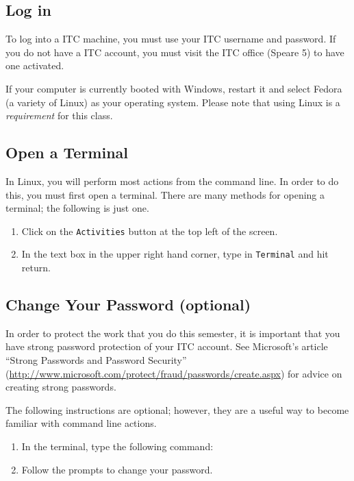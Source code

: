 \documentclass[11pt]{cselabheader}
\begin{document}
\subsection{Log in}
To log into a ITC machine, you must use your ITC username and password. If you
do not have a ITC account, you must visit the ITC office (Speare 5) to have one
activated.

If your computer is currently booted with Windows, restart it and select Fedora
(a variety of Linux) as your operating system. Please note that using Linux is a
\emph{requirement} for this class.

\subsection{Open a Terminal}
In Linux, you will perform most actions from the command line. In order to do
this, you must first open a terminal. There are many methods for opening a
terminal; the following is just one.

\begin{enumerate}
  \item Click on the \texttt{Activities} button at the top left of the screen.
  \item In the text box in the upper right hand corner, type in
    \texttt{Terminal} and hit return.
\end{enumerate}

\subsection{Change Your Password (optional)}
In order to protect the work that you do this semester, it is important that you
have strong password protection of your ITC account.  See Microsoft's article
``Strong Passwords and Password Security''
(\url{http://www.microsoft.com/protect/fraud/passwords/create.aspx}) for advice
on creating strong passwords.

The following instructions are optional; however, they are a useful way to
become familiar with command line actions.

\begin{enumerate}
  \item In the terminal, type the following command:


  \item Follow the prompts to change your password.
\end{enumerate}
\end{document}
